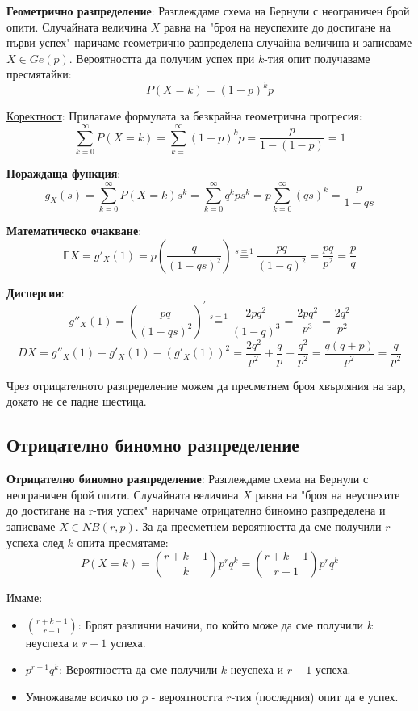 \documentclass{article}
\renewcommand{\\}{\newline}
\begin{document}
\textbf{Геометрично разпределение}: Разглеждаме схема на Бернули с неограничен брой опити. Случайната величина \(X\) равна на "броя на неуспехите до достигане на първи успех" наричаме геометрично разпределена случайна величина и записваме \(X \in Ge(p)\). Вероятността да получим успех при \(k\)-тия опит получаваме пресмятайки: \[
  P(X=k) = (1-p)^{k}p
\] 

\underline{Коректност}: Прилагаме формулата за безкрайна геометрична прогресия: \[
  \sum_{k=0}^{\infty}P(X=k) = \sum_{k=}^{\infty}(1-p)^{k}p = \frac{p}{1-(1-p)}= 1
\] 

\textbf{Пораждаща функция}:\[
  g_{X}(s) = \sum_{k=0}^{\infty}P(X=k)s^{k} = \sum_{k=0}^{\infty}q^{k}ps^{k} = p \sum_{k=0}^{\infty}(qs)^{k} = \frac{p}{1 - qs}
\] 

\textbf{Математическо очакване}: \[
  \mathbb{E}X = g'_{X}(1) = p \left(\frac{q}{(1-qs)^{2}}\right) \overset{s=1}{=} \frac{pq}{(1-q)^{2}} = \frac{pq}{p^{2}} = \frac{p}{q}
\] 

\textbf{Дисперсия}:
\[
  g''_{X}(1) = \left(\frac{pq}{(1-qs)^{2}}\right)^{\prime} \overset{s=1}{=} \frac{2pq^{2}}{(1-q)^{3}} = \frac{2pq^{2}}{p^{3}} = \frac{2q^{2}}{p^{2}}
\]  
\[
  DX = g''_{X}(1) + g'_{X}(1) - (g'_{X}(1))^{2} = \frac{2q^{2}}{p^{2}} + \frac{q}{p} - \frac{q^{2}}{p^{2}} = \frac{q(q+p)}{p^{2}} = \frac{q}{p^{2}}
\] 

Чрез отрицателното разпределение можем да пресметнем броя хвърляния на зар, докато не се падне шестица.

\subsection{Отрицателно биномно разпределение}

\textbf{Отрицателно биномно разпределение}: Разглеждаме схема на Бернули с неограничен брой опити. Случайната величина \(X\) равна на "броя на неуспехите до достигане на r-тия успех" наричаме отрицателно биномно разпределена и записваме \(X \in NB(r, p)\). За да пресметнем вероятността да сме получили \(r\) успеха след \(k\) опита пресмятаме: \[
  P(X=k) = \binom{r+k-1}{k}p^{r}q^{k} = \binom{r+k-1}{r-1}p^{r}q^{k}
\]   

Имаме: \begin{itemize}
  \item \(\binom{r+k-1}{r-1}\): Броят различни начини, по който може да сме получили \(k\) неуспеха и \(r-1\) успеха.
  \item \(p^{r-1}q^{k}\): Вероятността да сме получили \(k\) неуспеха и \(r-1\) успеха.
  \item Умножаваме всичко по \(p\) - вероятността \(r\)-тия (последния) опит да е успех.  
\end{itemize}
\end{document}
